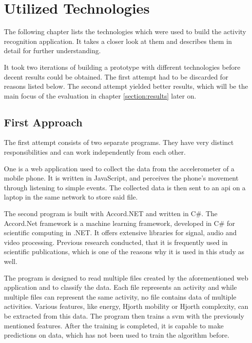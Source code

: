 \section{Utilized Technologies}
\label{section:technologies}

The following chapter lists the technologies which were used to build the activity recognition application. It takes a closer look at them and describes them in detail for further understanding.

It took two iterations of building a prototype with different technologies before decent results could be obtained. The first attempt had to be discarded for reasons listed below. The second attempt yielded better results, which will be the main focus of the evaluation in chapter \ref{section:results} later on.

\subsection{First Approach}

The first attempt consists of two separate programs. They have very distinct responsibilities and can work independently from each other.

One is a web application used to collect the data from the accelerometer of a mobile phone. It is written in JavaScript, and perceives the phone's movement through listening to simple events. The collected data is then sent to an \gls{api} on a laptop in the same network to store said file.

The second program is built with Accord.NET \autocite[]{accord.net} and written in C\#. The Accord.Net framework is a machine learning framework, developed in C\# for scientific computing in .NET. It offers extensive libraries for signal, audio and video processing. Previous research conducted, that it is frequently used in scientific publications, which is one of the reasons why it is used in this study as well.

The program is designed to read multiple files created by the aforementioned web application and to classify the data. Each file represents an activity and while multiple files can represent the same activity, no file contains data of multiple activities. Various features, like energy, Hjorth mobility or Hjorth complexity, can be extracted from this data. The program then trains a \gls{svm} with the previously mentioned features. After the training is completed, it is capable to make predictions on data, which has not been used to train the algorithm before.

